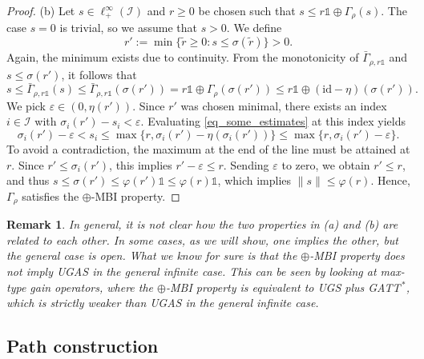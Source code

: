 \documentclass[10pt, oneside, a4paper]{article}
\newcommand{\ep}{\varepsilon}
\newcommand{\unit}{\mathds{1}}
\newcommand{\id}{\mathrm{id}}
\newcommand{\IC}{\mathcal{I}}
\newcommand{\bsign}[1]{\bar{#1}}
\newtheorem{remark}{Remark}[section]
\begin{document}
\begin{proof}
(b) Let $s \in \ell^{\infty}_+(\IC)$ and $r \geq 0$ be chosen such that $s \leq r\unit \oplus \Gamma_{\rho}(s)$. The case $s = 0$ is trivial, so we assume that $s > 0$. We define%
\begin{equation*}
  r' := \min\{ \tilde{r} \geq 0 : s \leq \sigma(\tilde{r}) \} > 0.%
\end{equation*}
Again, the minimum exists due to continuity. From the monotonicity of $\bsign{\Gamma}_{\rho,r\unit}$ and $s \leq \sigma(r')$, it follows that%
\begin{equation}\label{eq_some_estimates}
  s \leq \bsign{\Gamma}_{\rho,r\unit}(s) \leq \bsign{\Gamma}_{\rho,r\unit}(\sigma(r')) = r\unit \oplus \Gamma_{\rho}(\sigma(r')) \leq r\unit \oplus (\id - \eta)(\sigma(r')).%
\end{equation}
We pick $\ep \in (0,\eta(r'))$. Since $r'$ was chosen minimal, there exists an index $i \in \IC$ with $\sigma_i(r') - s_i < \ep$. Evaluating \eqref{eq_some_estimates} at this index yields%
\begin{equation*}
  \sigma_i(r') - \ep < s_i \leq \max\{r, \sigma_i(r') - \eta(\sigma_i(r')) \} \leq \max\{r, \sigma_i(r') - \ep\}.%
\end{equation*}
To avoid a contradiction, the maximum at the end of the line must be attained at $r$. Since $r' \leq \sigma_i(r')$, this implies $r' - \ep \leq r$. Sending $\ep$ to zero, we obtain $r' \leq r$, and thus $s \leq \sigma(r') \leq \varphi(r')\unit \leq \varphi(r)\unit$, which implies $\|s\| \leq \varphi(r)$. Hence, $\Gamma_{\rho}$ satisfies the $\oplus$-MBI property.%
\end{proof}

\begin{remark}
In general, it is not clear how the two properties in (a) and (b) are related to each other. In some cases, as we will show, one implies the other, but the general case is open. What we know for sure is that the $\oplus$-MBI property does not imply UGAS in the general infinite case. This can be seen by looking at max-type gain operators, where the $\oplus$-MBI property is equivalent to UGS plus GATT$^{\,*}$, which is strictly weaker than UGAS in the general infinite case.
\end{remark}

\subsection{Path construction}\label{subsec_path_construction}
\end{document}

